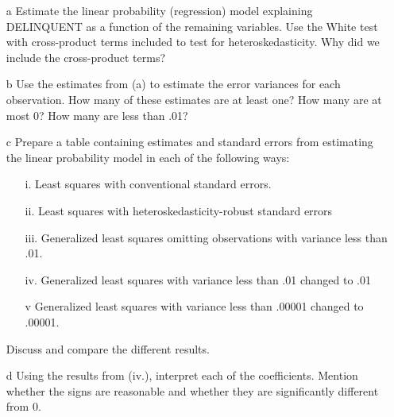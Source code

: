 \documentclass[xcolor={dvipsnames}]{beamer}
\begin{document}
\begin{frame}[allowframebreaks]{8.22}
	\begin{itemize}
		\item[a] Estimate the linear probability (regression) model explaining DELINQUENT as a function of the remaining variables. Use the White test with cross-product terms included to test for heteroskedasticity. Why did we include the cross-product terms?
		\item[b] Use the estimates from (a) to estimate the error variances for each observation. How many of these estimates are at least one? How many are at most 0? How many are less than .01?
		\item[c] Prepare a table containing estimates and standard errors from estimating the linear probability model in each of the following ways:
		\begin{itemize}
			\item[i.] Least squares with conventional standard errors.
			\item[ii.] Least squares with heteroskedasticity-robust standard errors
			\item[iii.] Generalized least squares omitting observations with variance less than .01.
			\item[iv.] Generalized least squares with variance less than .01 changed to .01
			\item [v] Generalized least squares with variance less than .00001 changed to .00001.
		\end{itemize} 
		Discuss and compare the different results.
		\item[d] Using the results from (iv.), interpret each of the coefficients. Mention whether the signs are reasonable and whether they are significantly different from 0.
	\end{itemize}

\end{frame}
\end{document}
